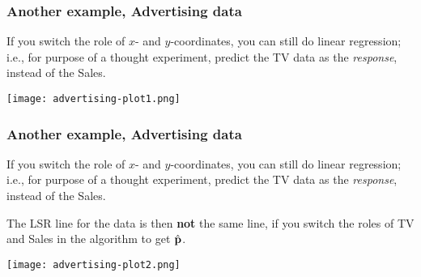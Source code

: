 \documentclass{beamer}
\theoremstyle{example}
\begin{document}
\begin{frame}[fragile]
\frametitle{Another example, Advertising data}
If you switch the role of $x$- and $y$-coordinates, you can still do linear regression; i.e., for purpose of a thought experiment, predict the TV data as the \emph{response}, instead of the Sales.


\vspace*{12pt}
\centering
\texttt{[image: advertising-plot1.png]}

\end{frame}
    
\begin{frame}[fragile]
\frametitle{Another example, Advertising data}
If you switch the role of $x$- and $y$-coordinates, you can still do linear regression; i.e., for purpose of a thought experiment, predict the TV data as the \emph{response}, instead of the Sales.

The LSR line for the data is then \textbf{not} the same line, if you switch the roles of TV and Sales in the algorithm to get $\hat{\bf p}$.

\vspace*{12pt}
\centering
\texttt{[image: advertising-plot2.png]}

\end{frame}
\end{document}
